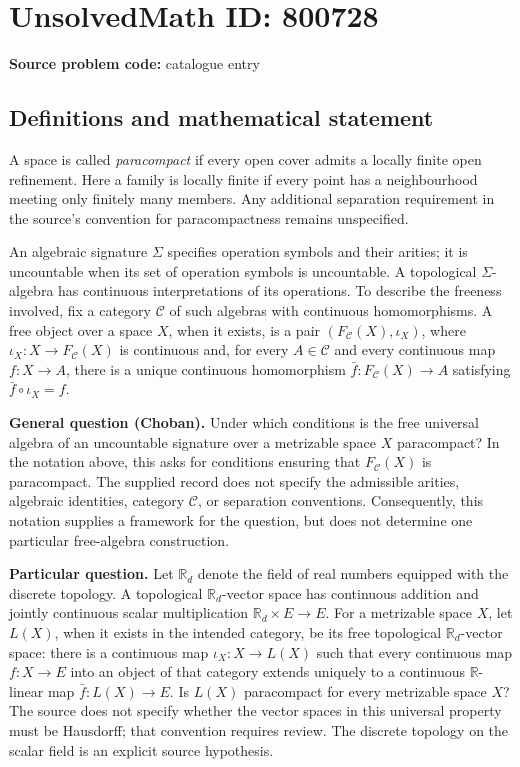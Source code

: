 \documentclass[11pt]{article}
\newcommand{\R}{\mathbb{R}}
\begin{document}
\section*{UnsolvedMath ID: 800728}
\textbf{Source problem code:} catalogue entry
\subsection{Definitions and mathematical statement}
A space is called \emph{paracompact} if every open cover admits a locally finite open refinement. Here a family is locally finite if every point has a neighbourhood meeting only finitely many members. Any additional separation requirement in the source's convention for paracompactness remains unspecified.

An algebraic signature \(\Sigma\) specifies operation symbols and their arities; it is uncountable when its set of operation symbols is uncountable. A topological \(\Sigma\)-algebra has continuous interpretations of its operations. To describe the freeness involved, fix a category \(\mathcal C\) of such algebras with continuous homomorphisms. A free object over a space \(X\), when it exists, is a pair \((F_{\mathcal C}(X),\iota_X)\), where \(\iota_X:X\to F_{\mathcal C}(X)\) is continuous and, for every \(A\in\mathcal C\) and every continuous map \(f:X\to A\), there is a unique continuous homomorphism \(\bar f:F_{\mathcal C}(X)\to A\) satisfying \(\bar f\circ\iota_X=f\).

\textbf{General question (Choban).} Under which conditions is the free universal algebra of an uncountable signature over a metrizable space \(X\) paracompact? In the notation above, this asks for conditions ensuring that \(F_{\mathcal C}(X)\) is paracompact. The supplied record does not specify the admissible arities, algebraic identities, category \(\mathcal C\), or separation conventions. Consequently, this notation supplies a framework for the question, but does not determine one particular free-algebra construction.

\textbf{Particular question.} Let \(\R_d\) denote the field of real numbers equipped with the discrete topology. A topological \(\R_d\)-vector space has continuous addition and jointly continuous scalar multiplication \(\R_d\times E\to E\). For a metrizable space \(X\), let \(L(X)\), when it exists in the intended category, be its free topological \(\R_d\)-vector space: there is a continuous map \(\iota_X:X\to L(X)\) such that every continuous map \(f:X\to E\) into an object of that category extends uniquely to a continuous \(\R\)-linear map \(\bar f:L(X)\to E\). Is \(L(X)\) paracompact for every metrizable space \(X\)? The source does not specify whether the vector spaces in this universal property must be Hausdorff; that convention requires review. The discrete topology on the scalar field is an explicit source hypothesis.
\end{document}
